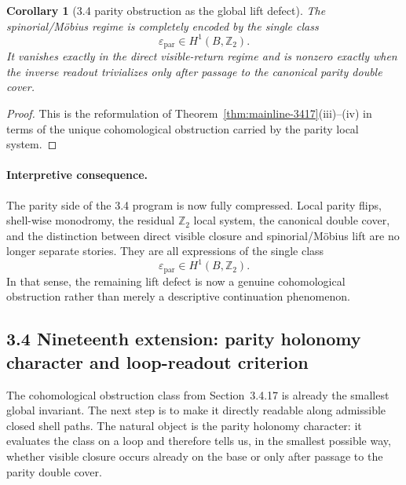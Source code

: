 \documentclass[12pt,a4paper]{article}
\newtheorem{corollary}[theorem]{Corollary}
\begin{document}
\begin{corollary}[3.4 parity obstruction as the global lift defect]
\label{cor:mainline-3417}
The spinorial/M\"obius regime is completely encoded by the single class
\[
 \varepsilon_{\mathrm{par}}\in H^1(B,\mathbb Z_2).
\]
It vanishes exactly in the direct visible-return regime and is nonzero exactly when the inverse readout trivializes only after passage to the canonical parity double cover.
\end{corollary}

\begin{proof}
This is the reformulation of Theorem~\ref{thm:mainline-3417}(iii)--(iv) in terms of the unique cohomological obstruction carried by the parity local system.
\end{proof}

\paragraph{Interpretive consequence.}
The parity side of the 3.4 program is now fully compressed. Local parity flips, shell-wise monodromy, the residual $\mathbb Z_2$ local system, the canonical double cover, and the distinction between direct visible closure and spinorial/M\"obius lift are no longer separate stories. They are all expressions of the single class
\[
 \varepsilon_{\mathrm{par}}\in H^1(B,\mathbb Z_2).
\]
In that sense, the remaining lift defect is now a genuine cohomological obstruction rather than merely a descriptive continuation phenomenon.


\subsection*{3.4 Nineteenth extension: parity holonomy character and loop-readout criterion}
The cohomological obstruction class from Section~3.4.17 is already the smallest global invariant. The next step is to make it directly readable along admissible closed shell paths. The natural object is the parity holonomy character: it evaluates the class on a loop and therefore tells us, in the smallest possible way, whether visible closure occurs already on the base or only after passage to the parity double cover.
\end{document}
